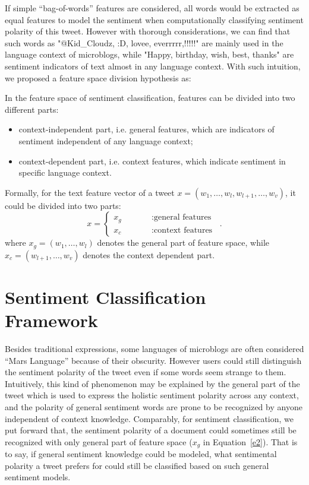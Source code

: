 \documentclass{llncs}
\begin{document}
If simple ``bag-of-words'' features are considered, all words would be extracted as equal features to model the sentiment when computationally classifying sentiment polarity of this tweet. 
However with thorough considerations, we can find that such words as "@Kid\_Cloudz, :D, lovee, everrrrr,!!!!!" are mainly used in the  language context of microblogs, while "Happy, birthday, wish, best, thanks" are sentiment indicators of text almost in any language context. 
With such intuition, we proposed a feature space division hypothesis as:
\begin{hypothesis}
\label{h1}
In the feature space of sentiment classification, features can be divided into two different parts:
\begin{itemize}
\item context-independent part, i.e. general features, which are indicators of sentiment independent of any language context;
\item context-dependent part, i.e. context features, which indicate sentiment in specific language context.
\end{itemize}
\end{hypothesis}
Formally, for the text feature vector of a tweet $ x=\left(  w_{1},\dots,w_{l},w_{l+1},\dots,w_{v} \right) $, it could be divided into two parts:
\begin{equation}
\label{e2}
x=\left\{
\begin{array}{rcl}
x_{g}     & \qquad        &:\mbox{general features}\\
x_{c}     &  \qquad       &:\mbox{context features}
\end{array}
\right. \enspace .
\end{equation}
where $ x_{g}= \left( w_{1},\dots,w_{l}\right) $ denotes the general part of feature space, while $ x_{c}= \left( w_{l+1},\dots,w_{v}\right) $ denotes the context dependent part.

\section{Sentiment Classification Framework}
\label{framework}

Besides traditional expressions, some languages of microblogs are often considered ``Mars Language'' because of their obscurity.  
However users could still distinguish the sentiment polarity of the tweet even if some words seem strange to them.
Intuitively, this kind of phenomenon may be explained by the general part of the tweet which is used to express the holistic sentiment polarity across any context, and the polarity of general sentiment words are prone to be recognized by anyone independent of context knowledge. 
Comparably, for sentiment classification, we put forward that, the sentiment polarity of a document could sometimes still be recognized with only general part of feature space ($ x_{g} $ in Equation~\ref{e2}). 
That is to say, if general sentiment knowledge could be modeled, what sentimental polarity a tweet prefers for could still be classified based on such general sentiment models. 
\end{document}
